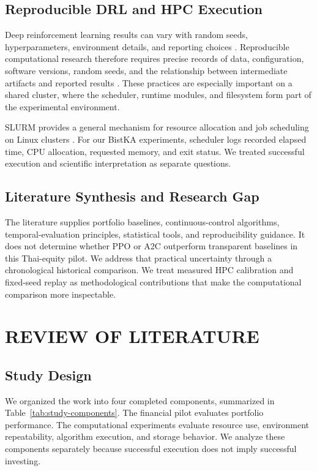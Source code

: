 \documentclass[12pt,a4paper,oneside]{book}
\theoremstyle{plain}
\numberwithin{equation}{chapter} \DeclareMathOperator{\Var}{Var}
\begin{document}
\section{Reproducible DRL and HPC Execution}

Deep reinforcement learning results can vary with random seeds, hyperparameters, environment details, and reporting choices \cite{henderson2018drl}. Reproducible computational research therefore requires precise records of data, configuration, software versions, random seeds, and the relationship between intermediate artifacts and reported results \cite{sandve2013reproducible}. These practices are especially important on a shared cluster, where the scheduler, runtime modules, and filesystem form part of the experimental environment.

SLURM provides a general mechanism for resource allocation and job scheduling on Linux clusters \cite{yoo2003slurm}. For our BistKA experiments, scheduler logs recorded elapsed time, CPU allocation, requested memory, and exit status. We treated successful execution and scientific interpretation as separate questions.

\section{Literature Synthesis and Research Gap}

The literature supplies portfolio baselines, continuous-control algorithms, temporal-evaluation principles, statistical tools, and reproducibility guidance. It does not determine whether PPO or A2C outperform transparent baselines in this Thai-equity pilot. We address that practical uncertainty through a chronological historical comparison. We treat measured HPC calibration and fixed-seed replay as methodological contributions that make the computational comparison more inspectable.

\FloatBarrier

\chapter{REVIEW OF LITERATURE}

\section{Study Design}

We organized the work into four completed components, summarized in Table~\ref{tab:study-components}. The financial pilot evaluates portfolio performance. The computational experiments evaluate resource use, environment repeatability, algorithm execution, and storage behavior. We analyze these components separately because successful execution does not imply successful investing.
\end{document}
